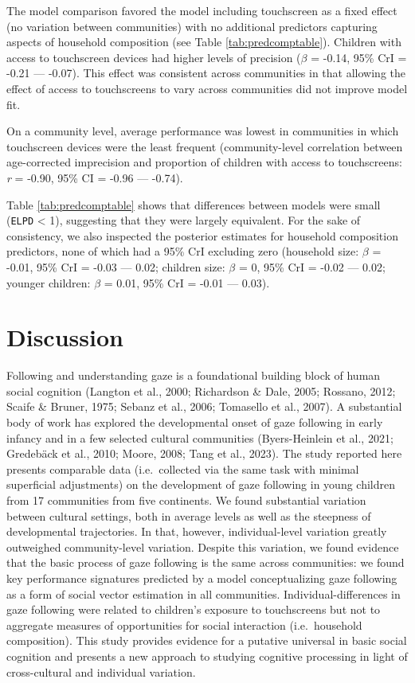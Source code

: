 \documentclass[
  man,floatsintext]{apa7}
\begin{document}
The model comparison favored the model including touchscreen as a fixed effect (no variation between communities) with no additional predictors capturing aspects of household composition (see Table \ref{tab:predcomptable}). Children with access to touchscreen devices had higher levels of precision (\(\beta\) = -0.14, 95\% CrI = -0.21 --- -0.07). This effect was consistent across communities in that allowing the effect of access to touchscreens to vary across communities did not improve model fit.

On a community level, average performance was lowest in communities in which touchscreen devices were the least frequent (community-level correlation between age-corrected imprecision and proportion of children with access to touchscreens: \emph{r} = -0.90, 95\% CI = -0.96 --- -0.74).

Table \ref{tab:predcomptable} shows that differences between models were small (\texttt{ELPD} \textless{} 1), suggesting that they were largely equivalent. For the sake of consistency, we also inspected the posterior estimates for household composition predictors, none of which had a 95\% CrI excluding zero (household size: \(\beta\) = -0.01, 95\% CrI = -0.03 --- 0.02; children size: \(\beta\) = 0, 95\% CrI = -0.02 --- 0.02; younger children: \(\beta\) = 0.01, 95\% CrI = -0.01 --- 0.03).

\hypertarget{discussion}{%
\section{Discussion}\label{discussion}}

Following and understanding gaze is a foundational building block of human social cognition (Langton et al., 2000; Richardson \& Dale, 2005; Rossano, 2012; Scaife \& Bruner, 1975; Sebanz et al., 2006; Tomasello et al., 2007). A substantial body of work has explored the developmental onset of gaze following in early infancy and in a few selected cultural communities (Byers-Heinlein et al., 2021; Gredebäck et al., 2010; Moore, 2008; Tang et al., 2023). The study reported here presents comparable data (i.e.~collected via the same task with minimal superficial adjustments) on the development of gaze following in young children from 17 communities from five continents. We found substantial variation between cultural settings, both in average levels as well as the steepness of developmental trajectories. In that, however, individual-level variation greatly outweighed community-level variation. Despite this variation, we found evidence that the basic process of gaze following is the same across communities: we found key performance signatures predicted by a model conceptualizing gaze following as a form of social vector estimation in all communities. Individual-differences in gaze following were related to children's exposure to touchscreens but not to aggregate measures of opportunities for social interaction (i.e.~household composition). This study provides evidence for a putative universal in basic social cognition and presents a new approach to studying cognitive processing in light of cross-cultural and individual variation.
\end{document}
